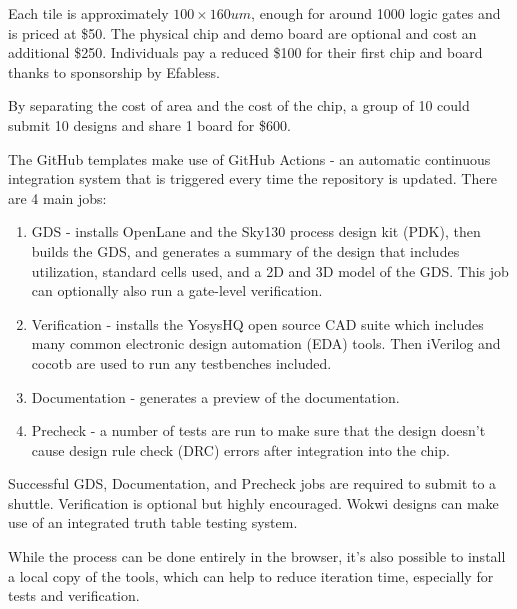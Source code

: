 Each tile is approximately $100\times 160 um$, enough for around 1000 logic gates and is priced at \$50.
The physical chip and demo board are optional and cost an additional \$250.
Individuals pay a reduced \$100 for their first chip and board thanks to sponsorship by Efabless\cite{efabless}.

By separating the cost of area and the cost of the chip, a group of 10 could submit 10 designs and share 1 board for \$600.

The GitHub templates\cite{verilogtemplate} make use of GitHub Actions\cite{githubactions} - an automatic continuous integration system that is triggered every time the repository is updated.
There are 4 main jobs:

\begin{enumerate}
	\item GDS - installs OpenLane and the Sky130 process design kit (PDK), then builds the GDS, and generates a summary of the design that includes utilization, standard cells used, and a 2D and 3D model of the GDS.
This job can optionally also run a gate-level verification.
	\item Verification - installs the YosysHQ open source CAD suite which includes many common electronic design automation (EDA) tools.
Then iVerilog\cite{iverilog} and cocotb\cite{cocotb} are used to run any testbenches included.
	\item Documentation - generates a preview of the documentation.
	\item Precheck - a number of tests are run to make sure that the design doesn’t cause design rule check (DRC) errors after integration into the chip.
\end{enumerate}

Successful GDS, Documentation, and Precheck jobs are required to submit to a shuttle.
Verification is optional but highly encouraged. Wokwi designs can make use of an integrated truth table testing system\cite{automatedtesting}.

While the process can be done entirely in the browser, it’s also possible to install a local copy of the tools, which can help to reduce iteration time, especially for tests and verification.

